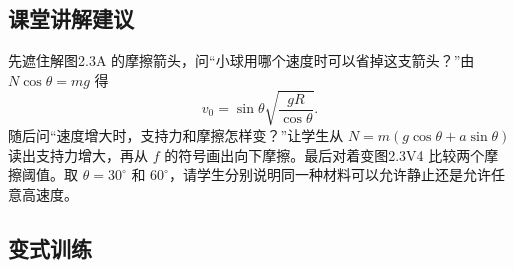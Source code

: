 \documentclass[UTF8,fontset=fandol,a4paper,11pt]{ctexart}
\begin{document}


\subsection*{课堂讲解建议}

先遮住解图2.3A 的摩擦箭头，问“小球用哪个速度时可以省掉这支箭头？”由 $N\cos\theta=mg$ 得
\[
v_0=\sin\theta\sqrt{\frac{gR}{\cos\theta}}.
\]
随后问“速度增大时，支持力和摩擦怎样变？”让学生从 $N=m(g\cos\theta+a\sin\theta)$ 读出支持力增大，再从 $f$ 的符号画出向下摩擦。最后对着变图2.3V4 比较两个摩擦阈值。取 $\theta=30^\circ$ 和 $60^\circ$，请学生分别说明同一种材料可以允许静止还是允许任意高速度。



\subsection*{变式训练}
\end{document}
